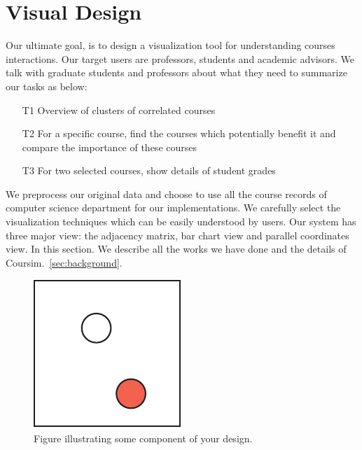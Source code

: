 \section{Visual Design} %
\label{sec:vis}

Our ultimate goal, is to design a visualization tool for understanding courses interactions. Our target users are professors, students and academic advisors. We talk with graduate students and professors about what they need to summarize our tasks as below:
\begin{itemize}
	\item [T1] Overview of clusters of correlated courses
	\item [T2] For a specific course, find the courses which potentially benefit it and compare the importance of these courses
	\item [T3] For two selected courses, show details of student grades
\end{itemize}

We preprocess our original data and choose to use all the course records of computer science department for our implementations. We carefully select the visualization techniques which can be easily understood by users. Our system has three major view: the adjacency matrix, bar chart view and parallel coordinates view. In this section. We describe all the works we have done and the details of Coursim.~\ref{sec:background}.


\begin{figure}[h]
 \centering %
 \includegraphics[width=\columnwidth]{figs/sample} 
 \caption{Figure illustrating some component of your design.}
 \label{fig:sample}
\end{figure}



